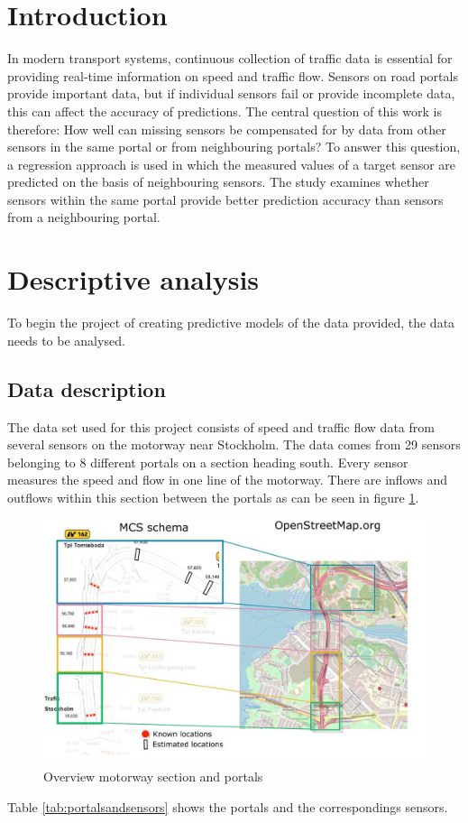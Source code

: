 	\section{Introduction}
	In modern transport systems, continuous collection of traffic data is essential for providing real-time information on speed and traffic flow. Sensors on road portals provide important data, but if individual sensors fail or provide incomplete data, this can affect the accuracy of predictions. The central question of this work is therefore: How well can missing sensors be compensated for by data from other sensors in the same portal or from neighbouring portals?
	To answer this question, a regression approach is used in which the measured values of a target sensor are predicted on the basis of neighbouring sensors. The study examines whether sensors within the same portal provide better prediction accuracy than sensors from a neighbouring portal. 
	
	\section{Descriptive analysis}
	To begin the project of creating predictive models of the data provided, the data needs to be analysed.
	
	\subsection{Data description}
	The data set used for this project consists of speed and traffic flow data from several sensors on the motorway near Stockholm. The data comes from 29 sensors belonging to 8 different portals on a section heading south. Every sensor measures the speed and flow in one line of the motorway. There are inflows and outflows within this section between the portals as can be seen in figure \ref{fig:overview}.
	\begin{figure}[H]
		\centering
		\includegraphics[width=0.7\linewidth]{screenshots/overview}
		\caption{Overview motorway section and portals}
		\label{fig:overview}
	\end{figure}
	\noindent Table \ref{tab:portalsandsensors} shows the portals and the correspondings sensors.

